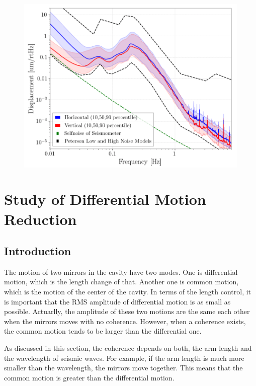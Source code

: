 \begin{figure}[h]
  \begin{center}   
    \includegraphics[width=16.0cm]{./img_chap3/img313.png}
    \caption{}\label{img:img313}
  \end{center}
\end{figure}


\newpage
\section{Study of Differential Motion Reduction}
\subsection{Introduction}
The motion of two mirrors in the cavity have two modes. One is differential motion, which is the length change of that. Another one is common motion, which is the motion of the center of the cavity. In terms of the length control, it is important that the RMS amplitude of differential motion is as small as possible. Actuarlly, the amplitude of these two motions are the same each other when the mirrors moves with no coherence. However, when a coherence exists, the common motion tends to be larger than the differential one. 

As discussed in this section, the coherence depends on both, the arm length and the wavelength of seismic waves. For example, if the arm length is much more smaller than the wavelength, the mirrors move together. This means that the common motion is greater than the differential motion.

